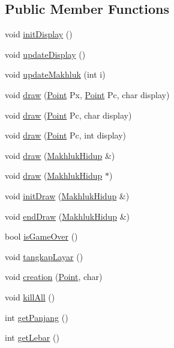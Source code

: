 \subsection*{Public Member Functions}
\begin{DoxyCompactItemize}
\item 
void \hyperlink{class_world_a3ccab52e143cc85200d3d4a5384c4559}{init\+Display} ()
\item 
void \hyperlink{class_world_a0656cc8aa64881db8880d6a1af0d5aea}{update\+Display} ()
\item 
void \hyperlink{class_world_a724bfca6248fdb1088143be2cab280e2}{update\+Makhluk} (int i)
\item 
void \hyperlink{class_world_a4b86052df7db7bb46cca3e195c8bf898}{draw} (\hyperlink{class_point}{Point} Px, \hyperlink{class_point}{Point} Pc, char display)
\item 
void \hyperlink{class_world_ae08f8491c85c42b9951fa51b1b859fa7}{draw} (\hyperlink{class_point}{Point} Pc, char display)
\item 
void \hyperlink{class_world_a34b02a09a430919369fa3cf6c664f384}{draw} (\hyperlink{class_point}{Point} Pc, int display)
\item 
void \hyperlink{class_world_abb9e5b837315e20d4cdca5b154b9730d}{draw} (\hyperlink{class_makhluk_hidup}{Makhluk\+Hidup} \&)
\item 
void \hyperlink{class_world_ad1e2e50d7734e8e86c45a2e94d8a3a7c}{draw} (\hyperlink{class_makhluk_hidup}{Makhluk\+Hidup} $\ast$)
\item 
void \hyperlink{class_world_a90d88a70e0db9152a75fda712cf7dd43}{init\+Draw} (\hyperlink{class_makhluk_hidup}{Makhluk\+Hidup} \&)
\item 
void \hyperlink{class_world_ab11226032a384c6afedc09b28664a7fc}{end\+Draw} (\hyperlink{class_makhluk_hidup}{Makhluk\+Hidup} \&)
\item 
bool \hyperlink{class_world_a461cec44996dcc3cfd000d7985647c8b}{is\+Game\+Over} ()
\item 
void \hyperlink{class_world_a1a58ba32325aef74e5d5e769a5f04509}{tangkap\+Layar} ()
\item 
void \hyperlink{class_world_ad7791111d93057dcb5bf09628e57acf4}{creation} (\hyperlink{class_point}{Point}, char)
\item 
void \hyperlink{class_world_ab61b44377b5e8fe932a81637ac18745d}{kill\+All} ()
\item 
int \hyperlink{class_world_ae3981cbe197803860dff3ae04b18308d}{get\+Panjang} ()
\item 
int \hyperlink{class_world_a5a33d5a170d3f85d7ca239467b23422e}{get\+Lebar} ()
\end{DoxyCompactItemize}
